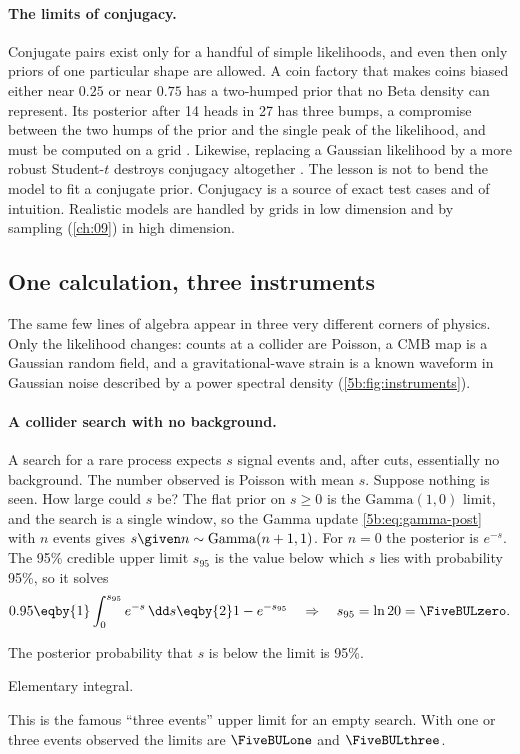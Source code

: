 \paragraph{The limits of conjugacy.}
Conjugate pairs exist only for a handful of simple likelihoods, and even then only
priors of one particular shape are allowed. A coin factory that makes coins biased
either near $0.25$ or near $0.75$ has a two-humped prior that no Beta density can
represent. Its posterior after 14 heads in 27 has three bumps, a compromise between the
two humps of the prior and the single peak of the likelihood, and must be computed on a
grid . Likewise, replacing a Gaussian likelihood by a more
robust Student-$t$ destroys conjugacy altogether . The lesson is
not to bend the model to fit a conjugate prior. Conjugacy is a source of exact test
cases and of intuition. Realistic models are handled by grids in low dimension and by
sampling (\cref{ch:09}) in high dimension.

\subsection{One calculation, three instruments}

The same few lines of algebra appear in three very different corners of physics. Only
the likelihood changes: counts at a collider are Poisson, a CMB map is a Gaussian random
field, and a gravitational-wave strain is a known waveform in Gaussian noise described
by a power spectral density (\cref{5b:fig:instruments}).

\paragraph{A collider search with no background.}
A search for a rare process expects $s$ signal events and, after cuts, essentially no
background. The number observed is Poisson with mean $s$. Suppose nothing is seen. How
large could $s$ be? The flat prior on $s\ge0$ is the $\mathrm{Gamma}(1,0)$ limit, and
the search is a single window, so the Gamma update \eqref{5b:eq:gamma-post} with $n$
events gives $s\given n\sim\mathrm{Gamma}(n+1,1)$. For $n=0$ the posterior is $e^{-s}$.
The 95\% credible upper limit $s_{95}$ is the value below which $s$ lies with
probability 95\%, so it solves
\begin{align*}
  0.95\eqby{1}\int_0^{s_{95}}e^{-s}\,\dd s\eqby{2}1-e^{-s_{95}}
  \quad\Rightarrow\quad s_{95}=\ln 20=\FiveBULzero .
\end{align*}
\begin{explain}
  \item The posterior probability that $s$ is below the limit is 95\%.
  \item Elementary integral.
\end{explain}
This is the famous ``three events'' upper limit for an empty search. With one or three
events observed the limits are $\FiveBULone$ and $\FiveBULthree$.

